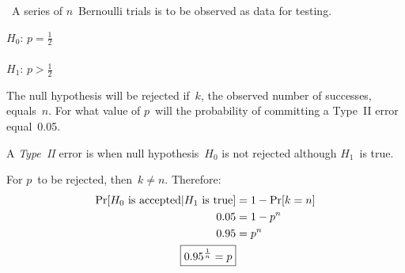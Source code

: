 \begin{problem}
  ~A series of $n$~Bernoulli trials is to be observed as data for testing.
  \begin{center}
    $H_0$: $p = \frac{1}{2}$ \\
     \\
    $H_1$: $p > \frac{1}{2}$ \\
  \end{center}
  \noindent
  The null hypothesis will be rejected if~$k$, the observed number of successes, equals~$n$.  For what value of $p$~will the probability of committing a Type~II error equal~0.05.
\end{problem}

A \textit{Type~II} error is when null hypothesis~$H_0$ is not rejected although $H_1$~is true.

For $p$~to be rejected, then~${k \ne n}$.  Therefore:
\begin{align*}
  \Pr\lbrack H_0 \text{ is accepted} \vert H_1 \text{ is true}\rbrack &= 1 - \Pr\lbrack k = n\rbrack \\
            0.05 &= 1 - p^n \\
            0.95 &= p^n \\
            \boxed{0.95^{\frac{1}{n}} = p}
\end{align*}
